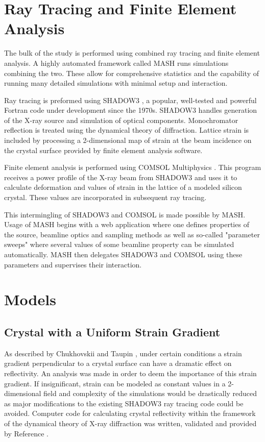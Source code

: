 \documentclass[preprint]{iucr}              %
\begin{document}
\section{Ray Tracing and Finite Element Analysis}

The bulk of the study is performed using combined ray tracing and finite element analysis. A highly automated framework called MASH \cite{mash} runs simulations combining the two. These allow for comprehensive statistics and the capability of running many detailed simulations with minimal setup and interaction.

Ray tracing is preformed using SHADOW3 \cite{shadow3}, a popular, well-tested and powerful Fortran code under development since the 1970s. SHADOW3 handles generation of the X-ray source and simulation of optical components. Monochromator reflection is treated using the dynamical theory of diffraction. Lattice strain is included by processing a 2-dimensional map of strain at the beam incidence on the crystal surface provided by finite element analysis software.

Finite element analysis is performed using COMSOL Multiphysics \cite{comsol}. This program receives a power profile of the X-ray beam from SHADOW3 and uses it to calculate deformation and values of strain in the lattice of a modeled silicon crystal. These values are incorporated in subsequent ray tracing.

This intermingling of SHADOW3 and COMSOL is made possible by MASH. Usage of MASH begins with a web application where one defines properties of the source, beamline optics and sampling methods as well as so-called "parameter sweeps" where several values of some beamline property can be simulated automatically. MASH then delegates SHADOW3 and COMSOL using these parameters and supervises their interaction.
\section{Models}

\subsection{Crystal with a Uniform Strain Gradient}\label{strain_gradient} 
As described by Chukhovskii \cite{Chukhovskii} and Taupin \cite{Taupin}, under certain conditions a strain gradient perpendicular to a crystal surface can have a dramatic effect on reflectivity. An analysis was made in order to deem the importance of this strain gradient. If insignificant, strain can be modeled as constant values in a 2-dimensional field and complexity of the simulations would be drastically reduced as major modifications to the existing SHADOW3 ray tracing code could be avoided. Computer code for calculating crystal reflectivity within the framework of the dynamical theory of X-ray diffraction was written, validated and provided by Reference \cite{coins}.
\end{document}
